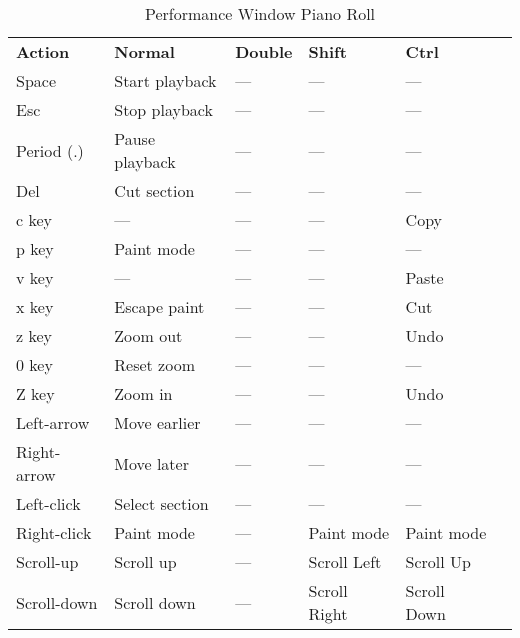    \begin{table}[H]
      \centering
      \caption{Performance Window Piano Roll}
      \label{table:perf_window_piano_roll}
      \begin{tabular}{l l l l l l}
         \textbf{Action}   & \textbf{Normal} & \textbf{Double}    & \textbf{Shift}     & \textbf{Ctrl}  \\
         Space             & Start playback  & ---                & ---                & ---            \\
         Esc               & Stop playback   & ---                & ---                & ---            \\
         Period (.)        & Pause playback  & ---                & ---                & ---            \\
         Del               & Cut section     & ---                & ---                & ---            \\
         c key             & ---             & ---                & ---                & Copy           \\
         p key             & Paint mode      & ---                & ---                & ---            \\
         v key             & ---             & ---                & ---                & Paste          \\
         x key             & Escape paint    & ---                & ---                & Cut            \\
         z key             & Zoom out        & ---                & ---                & Undo           \\
         0 key             & Reset zoom      & ---                & ---                & ---            \\
         Z key             & Zoom in         & ---                & ---                & Undo           \\
         Left-arrow        & Move earlier    & ---                & ---                & ---            \\
         Right-arrow       & Move later      & ---                & ---                & ---            \\
         Left-click        & Select section  & ---                & ---                & ---            \\
         Right-click       & Paint mode      & ---                & Paint mode         & Paint mode     \\
         Scroll-up         & Scroll up       & ---                & Scroll Left        & Scroll Up      \\
         Scroll-down       & Scroll down     & ---                & Scroll Right       & Scroll Down    \\
      \end{tabular}
   \end{table}

